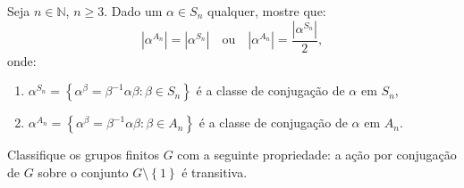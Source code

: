 \begin{exercise}
  Seja $n\in{\mathbb{N}}$, $n\geqslant{3}$. Dado um $\alpha\in{S_{n}}$ qualquer, mostre que:
  \[
    |\alpha^{A_{n}}|=|\alpha^{S_{n}}|
    \quad\text{ou}\quad
    |\alpha^{A_{n}}|=\frac{|\alpha^{S_{n}}|}{2},
  \]
  onde:
  \begin{enumerate}
    \item $\alpha^{S_{n}}=\left\{\alpha^{\beta}=\beta^{-1}\alpha\beta:\beta\in{S_{n}}\right\}$ é a classe de conjugação de $\alpha$ em $S_{n}$,
    \item $\alpha^{A_{n}}=\left\{\alpha^{\beta}=\beta^{-1}\alpha\beta:\beta\in{A_{n}}\right\}$ é a classe de conjugação de $\alpha$ em $A_{n}$.
  \end{enumerate}
\end{exercise}

\begin{exercise}
  Classifique os grupos finitos $G$ com a seguinte propriedade: a ação por conjugação de $G$ sobre o conjunto $G\setminus\left\{1\right\}$ é transitiva.
\end{exercise}
